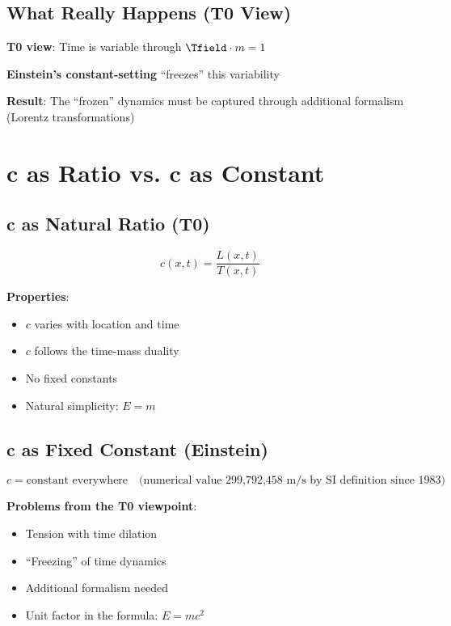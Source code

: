 	\subsection{What Really Happens (T0 View)}
	
	\textbf{T0 view}: Time is variable through $\Tfield \cdot m = 1$
	
	\textbf{Einstein's constant-setting} ``freezes'' this variability
	
	\textbf{Result}: The ``frozen'' dynamics must be captured through additional formalism (Lorentz transformations)
	
	\section{c as Ratio vs. c as Constant}
	
	\subsection{c as Natural Ratio (T0)}
	
	\begin{equation}
		c(x,t) = \frac{L(x,t)}{T(x,t)}
	\end{equation}
	
	\textbf{Properties}:
	\begin{itemize}
		\item $c$ varies with location and time
		\item $c$ follows the time-mass duality
		\item No fixed constants
		\item Natural simplicity: $E = m$
	\end{itemize}
	
	\subsection{c as Fixed Constant (Einstein)}
	
	\begin{equation}
		c = \text{constant everywhere} \quad \text{(numerical value 299,792,458 m/s by SI definition since 1983)}
	\end{equation}
	
	\textbf{Problems from the T0 viewpoint}:
	\begin{itemize}
		\item Tension with time dilation
		\item ``Freezing'' of time dynamics
		\item Additional formalism needed
		\item Unit factor in the formula: $E = mc^2$
	\end{itemize}
	
